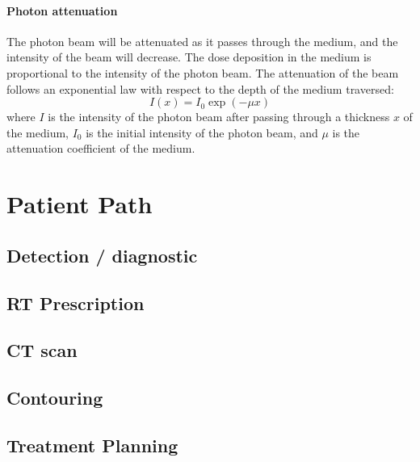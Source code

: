
\paragraph{Photon attenuation}
The photon beam will be attenuated as it passes through the medium, and the intensity of the beam will decrease.
The dose deposition in the medium is proportional to the intensity of the photon beam.
The attenuation of the beam follows an exponential law with respect to the depth of the medium traversed:
$$I(x) = I_0 \exp(-\mu x)$$
where $I$ is the intensity of the photon beam after passing through a thickness $x$ of the medium,
$I_0$ is the initial intensity of the photon beam,
and $\mu$ is the attenuation coefficient of the medium.



\section{Patient Path}

\subsection{Detection / diagnostic}
\subsection{RT Prescription}
\subsection{CT scan}
\subsection{Contouring}
\subsection{Treatment Planning}
